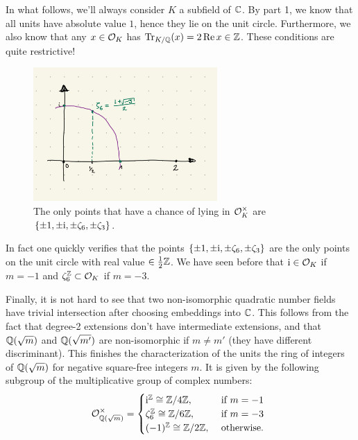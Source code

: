 \documentclass[a4paper,11pt]{article}
\begin{document}
\begin{enumerate}[wide, labelindent=0pt]
        In what follows, we'll always consider $K$ a subfield of $\mathbb{C}$. By part 1, we know
        that all units have absolute value $1$, hence they lie on the unit circle. 
        Furthermore, we also know that any $x \in \mathcal{O}_K$ has 
        $\operatorname{Tr}_{K/\mathbb{Q}}(x) = 2 \operatorname{Re} x \in \mathbb{Z}$. These conditions are quite restrictive!
        \begin{figure}[H]
        \centering
        \includegraphics[width = 7cm]{ROU.jpg}
        \caption{The only points that have a chance of lying in $\mathcal{O}_K^\times$ are 
        $\{\pm 1, \pm \mathrm i, \pm \zeta_6, \pm \zeta_3\}$.}
        \end{figure}
        In fact one quickly verifies that the points $\{\pm 1, \pm \mathrm i, \pm
        \zeta_6, \pm \zeta_3\}$ are the only points on the unit circle with 
        real value $\in \frac 12 \mathbb{Z}$. 
        We have seen before that $\mathrm i \in \mathcal{O}_K$ if $m = -1$ and 
        $\zeta_6^{\mathbb{Z}} \subset \mathcal{O}_K$ if $m = -3$.  
        
        Finally, it is not hard to see that two non-isomorphic quadratic number
        fields have trivial intersection after choosing embeddings into $\mathbb{C}$. This follows
        from the fact that degree-2 extensions don't have intermediate extensions, and
        that $\mathbb{Q}(\sqrt m)$ and $\mathbb{Q}(\sqrt {m'})$ are non-isomorphic if $m \neq m'$ 
        (they have different discriminant).
        This finishes the characterization of the units
        the ring of integers of $\mathbb{Q}(\sqrt m)$ for negative square-free integers $m$. 
        It is given by the following subgroup of the multiplicative group of
        complex numbers:
        \begin{equation*}
            \mathcal{O}_{\mathbb{Q}(\sqrt m)}^\times = \begin{cases}
                \mathrm i^{\mathbb{Z}} \cong \mathbb{Z}/4\mathbb{Z}, &\text{ if }m = -1\\
                \zeta_6^{\mathbb{Z}} \cong \mathbb{Z}/6\mathbb{Z}, &\text{ if }m = -3\\
                (-1)^{\mathbb{Z}} \cong \mathbb{Z}/2\mathbb{Z}, &\text{ otherwise. }
            \end{cases}
        \end{equation*}
\end{enumerate}
\end{document}
